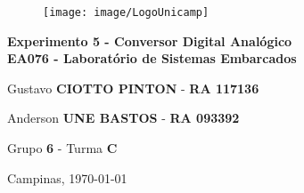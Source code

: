\begin{titlepage}
\vspace*{.28\textheight}
\begin{center}
%
\begin{figure}[h]
    \centering
    \texttt{[image: image/LogoUnicamp]}
\end{figure} 
%
\vspace*{10pt}
\textbf{\LARGE Experimento 5 - Conversor Digital Analógico} \\ \vspace{12pt}
\textbf{\large EA076 - Laboratório de Sistemas Embarcados}
\vspace*{72pt}

Gustavo \textbf{CIOTTO PINTON} - \textbf{RA 117136}

Anderson \textbf{UNE BASTOS} - \textbf{RA 093392}

\vspace{30pt} 

Grupo \textbf{6} - Turma \textbf{C}
 
\vspace{36pt}
Campinas, \today

\end{center}
\end{titlepage}

\newpage
